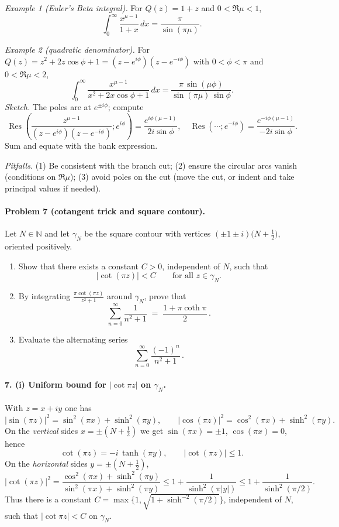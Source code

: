 \documentclass[11pt,a4paper]{article}
\theoremstyle{definition}
\theoremstyle{definition}
\theoremstyle{plain}
\theoremstyle{remark}
\DeclareMathOperator{\Res}{Res}
\begin{document}
\medskip
\emph{Example 1 (Euler’s Beta integral).}
For $Q(z)=1+z$ and $0<\Re\mu<1$,
\[
\int_{0}^{\infty}\frac{x^{\mu-1}}{1+x}\,dx
=\frac{\pi}{\sin(\pi\mu)}.
\]

\medskip
\emph{Example 2 (quadratic denominator).}
For $Q(z)=z^{2}+2z\cos\phi+1=(z-e^{i\phi})(z-e^{-i\phi})$ with $0<\phi<\pi$ and $0<\Re\mu<2$,
\[
\int_{0}^{\infty}\frac{x^{\mu-1}}{x^{2}+2x\cos\phi+1}\,dx
=\frac{\pi\,\sin(\mu\phi)}{\sin(\pi\mu)\,\sin\phi}.
\]
\emph{Sketch.} The poles are at $e^{\pm i\phi}$; compute
\[
\Res\left(\frac{z^{\mu-1}}{(z-e^{i\phi})(z-e^{-i\phi})};e^{i\phi}\right)
=\frac{e^{i\phi(\mu-1)}}{2i\sin\phi},\quad
\Res(\cdots;e^{-i\phi})=\frac{e^{-i\phi(\mu-1)}}{-2i\sin\phi}.
\]
Sum and equate with the bank expression.

\medskip
\emph{Pitfalls.}
(1) Be consistent with the branch cut; (2) ensure the circular arcs vanish (conditions on $\Re\mu$);
(3) avoid poles on the cut (move the cut, or indent and take principal values if needed).

\paragraph{Problem 7 (cotangent trick and square contour).}
Let $N\in\mathbb N$ and let $\gamma_N$ be the square contour with vertices
$(\pm1\pm i)\bigl(N+\tfrac12\bigr)$, oriented positively.
\begin{enumerate}[label=(\roman*)]
	\item Show that there exists a constant $C>0$, independent of $N$, such that
	\[
	|\cot(\pi z)|<C \qquad \text{for all } z\in\gamma_N .
	\]
	\item By integrating $\displaystyle \frac{\pi\cot(\pi z)}{z^{2}+1}$ around $\gamma_N$,
	prove that
	\[
	\sum_{n=0}^{\infty}\frac{1}{n^{2}+1}\;=\;\frac{1+\pi\coth\pi}{2}\, .
	\]
	\item Evaluate the alternating series
	\[
	\sum_{n=0}^{\infty}\frac{(-1)^{n}}{n^{2}+1}\, .
	\]
\end{enumerate}


\paragraph{7. (i) Uniform bound for $|\cot \pi z|$ on $\gamma_N$.}
With $z=x+iy$ one has
\[
|\sin(\pi z)|^{2}=\sin^{2}(\pi x)+\sinh^{2}(\pi y),\qquad
|\cos(\pi z)|^{2}=\cos^{2}(\pi x)+\sinh^{2}(\pi y).
\]
On the \emph{vertical} sides $x=\pm(N+\tfrac12)$ we get
$\sin(\pi x)=\pm1$, $\cos(\pi x)=0$, hence
\[
\cot(\pi z)=-i\,\tanh(\pi y),\qquad |\cot(\pi z)|\le 1.
\]
On the \emph{horizontal} sides $y=\pm(N+\tfrac12)$,
\[
|\cot(\pi z)|^{2}
=\frac{\cos^{2}(\pi x)+\sinh^{2}(\pi y)}{\sin^{2}(\pi x)+\sinh^{2}(\pi y)}
\le 1+\frac{1}{\sinh^{2}(\pi|y|)}
\le 1+\frac{1}{\sinh^{2}(\pi/2)}.
\]
Thus there is a constant
$C=\max\!\big\{1,\sqrt{1+\sinh^{-2}(\pi/2)}\big\}$, independent of $N$, such that
$|\cot \pi z|<C$ on $\gamma_N$.
\end{document}
